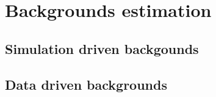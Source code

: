 \section{Backgrounds estimation}
\subsection{Simulation driven backgounds}
\subsection{Data driven backgrounds}
